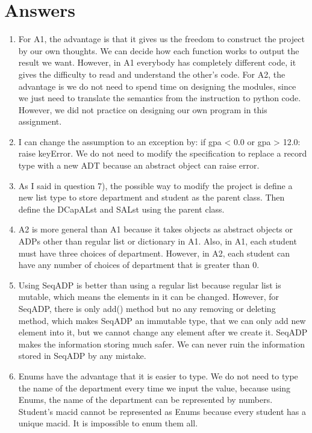 \documentclass[12pt]{article}
\begin{document}
\section{Answers}

\begin{enumerate}

\item For A1, the advantage is that it gives us the freedom to construct the project by our own thoughts. We can decide how each function works to output the result we want. However, in A1 everybody has completely different code, it gives the difficulty to read and understand the other’s code. 
For A2, the advantage is we do not need to spend time on designing the modules, since we just need to translate the semantics from the instruction to python code. However, we did not practice on designing our own program in this assignment.

\item I can change the assumption to an exception by: if gpa < 0.0 or gpa > 12.0: raise keyError. We do not need to modify the specification to replace a record type with a new ADT because an abstract object can raise error.

\item As I said in question 7), the possible way to modify the project is define a new list type to store department and student as the parent class. Then define the DCapALst and SALst using the parent class. 

\item A2 is more general than A1 because it takes objects as abstract objects or ADPs other than regular list or dictionary in A1. Also, in A1, each student must have three choices of department. However, in A2, each student can have any number of choices of department that is greater than 0.

\item Using SeqADP is better than using a regular list because regular list is mutable, which means the elements in it can be changed. However, for SeqADP, there is only add() method but no any removing or deleting method, which makes SeqADP an immutable type, that we can only add new element into it, but we cannot change any element after we create it. SeqADP makes the information storing much safer. We can never ruin the information stored in SeqADP by any mistake.

\item Enums have the advantage that it is easier to type. We do not need to type the name of the department every time we input the value, because using Enums, the name of the department can be represented by numbers. Student’s macid cannot be represented as Enums because every student has a unique macid. It is impossible to enum them all.





\end{enumerate}
\end{document}
